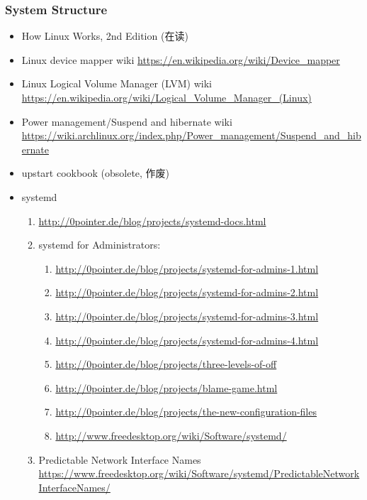 \documentclass{article}
\begin{document}
\subsubsection{System Structure}
%
\begin{itemize}
    \item How Linux Works, 2nd Edition (在读)
    \item Linux device mapper wiki \url{https://en.wikipedia.org/wiki/Device_mapper}
    \item Linux Logical Volume Manager (LVM) wiki \url{https://en.wikipedia.org/wiki/Logical_Volume_Manager_(Linux)}
    \item Power management/Suspend and hibernate wiki \url{https://wiki.archlinux.org/index.php/Power_management/Suspend_and_hibernate}
    \item upstart cookbook (obsolete, 作废)
    \item systemd
        \begin{enumerate}
            \item \url{http://0pointer.de/blog/projects/systemd-docs.html}
            \item systemd for Administrators:
                \begin{enumerate}
                    \item \url{http://0pointer.de/blog/projects/systemd-for-admins-1.html}
                    \item \url{http://0pointer.de/blog/projects/systemd-for-admins-2.html}
                    \item \url{http://0pointer.de/blog/projects/systemd-for-admins-3.html}
                    \item \url{http://0pointer.de/blog/projects/systemd-for-admins-4.html}
                    \item \url{http://0pointer.de/blog/projects/three-levels-of-off}
                    \item \url{http://0pointer.de/blog/projects/blame-game.html}
                    \item \url{http://0pointer.de/blog/projects/the-new-configuration-files}
                    \item \url{http://www.freedesktop.org/wiki/Software/systemd/}
                \end{enumerate}
            \item Predictable Network Interface Names \url{https://www.freedesktop.org/wiki/Software/systemd/PredictableNetworkInterfaceNames/}
        \end{enumerate}

\end{itemize}
\end{document}
